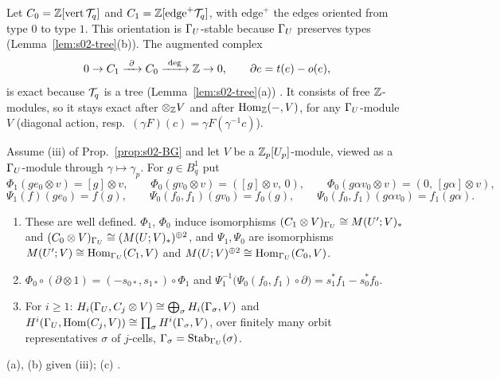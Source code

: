 Let $C_0=\mathbb{Z}[\mathrm{vert}\,\mathcal{T}_q]$ and $C_1=\mathbb{Z}[\mathrm{edge}^+\mathcal{T}_q]$, with $\mathrm{edge}^+$ the edges oriented from type $0$ to type $1$. This orientation is
$\Gamma_U$-stable because $\Gamma_U$ preserves types (Lemma~\ref{lem:s02-tree}(b)). The augmented complex
\begin{equation}\label{eq:s02-chains}
0\to C_1\xrightarrow{\ \partial\ }C_0\xrightarrow{\ \deg\ }\Z\to0,\qquad\partial e=t(e)-o(e),
\end{equation}
is exact because $\mathcal{T}_q$ is a tree (Lemma~\ref{lem:s02-tree}(a)) . It consists of free $\mathbb{Z}$-modules, so it stays
exact after $\otimes_{\mathbb{Z}} V$ and after $\operatorname{Hom}_{\mathbb{Z}}(-,V)$, for any $\Gamma_U$-module $V$ (diagonal action, resp.\ $(\gamma F)(c)=\gamma F(\gamma^{-1}c)$).

\begin{lemma}\label{lem:s02-cellmod}
Assume (iii) of Prop.~\ref{prop:s02-BG} and let $V$ be a $\mathbb{Z}_p[U_p]$-module, viewed as a $\Gamma_U$-module through $\gamma\mapsto\gamma_p$. For $g\in B^1_q$ put
\[\Phi_1(ge_0\otimes v)=[g]\otimes v,\qquad\Phi_0(gv_0\otimes v)=([g]\otimes v,\,0),\qquad\Phi_0(g\alpha v_0\otimes v)=(0,\,[g\alpha]\otimes v),\]
\[\Psi_1(f)(ge_0)=f(g),\qquad\Psi_0(f_0,f_1)(gv_0)=f_0(g),\qquad\Psi_0(f_0,f_1)(g\alpha v_0)=f_1(g\alpha).\]
\begin{enumerate}[label=(\alph*)]
\item These are well defined. $\Phi_1$, $\Phi_0$ induce isomorphisms $(C_1\otimes V)_{\Gamma_U}\cong M(U';V)_*$ and $(C_0\otimes V)_{\Gamma_U}\cong(M(U;V)_*)^{\oplus2}$, and
  $\Psi_1,\Psi_0$ are isomorphisms $M(U';V)\cong\operatorname{Hom}_{\Gamma_U}(C_1,V)$ and $M(U;V)^{\oplus2}\cong\operatorname{Hom}_{\Gamma_U}(C_0,V)$.
\item $\Phi_0\circ(\partial\otimes1)=(-s_{0*},s_{1*})\circ\Phi_1$ and $\Psi_1^{-1}\big(\Psi_0(f_0,f_1)\circ\partial\big)=s_1^*f_1-s_0^*f_0$.
\item For $i\ge1$: $H_i(\Gamma_U,C_j\otimes V)\cong\bigoplus_{\sigma}H_i(\Gamma_\sigma,V)$ and $H^i(\Gamma_U,\operatorname{Hom}(C_j,V))\cong\prod_\sigma H^i(\Gamma_\sigma,V)$, over finitely many orbit
  representatives $\sigma$ of $j$-cells, $\Gamma_\sigma=\operatorname{Stab}_{\Gamma_U}(\sigma)$.
\end{enumerate}
\end{lemma}
\noindent (a), (b) \stproved{} given (iii); (c) \stcited{}
.
